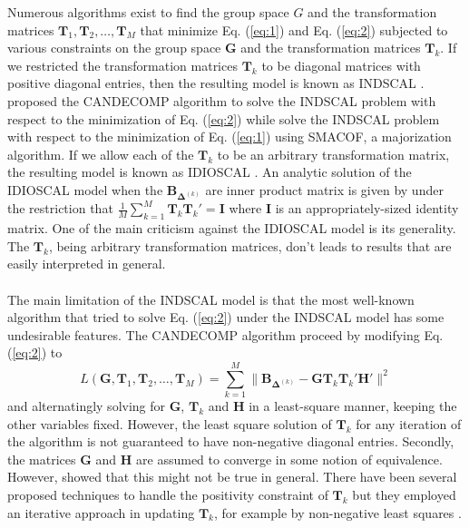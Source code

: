 \documentclass[11pt]{asaproc}
\begin{document}
  \noindent Numerous algorithms exist to find the group space $G$ and the
  transformation matrices $\mathbf{T}_1, \mathbf{T}_{2}, \dots,
  \mathbf{T}_M$ that minimize Eq. (\ref{eq:1}) and Eq. (\ref{eq:2})
  subjected to various constraints on the group space $\mathbf{G}$ and
  the transformation matrices $\mathbf{T}_k$. If we restricted the
  transformation matrices $\mathbf{T}_k$ to be diagonal matrices with
  positive diagonal entries, then the resulting model is known as
  INDSCAL \citep{carroll70:_analy_n_eckar_young}. \citet{carroll70:_analy_n_eckar_young}
  proposed the CANDECOMP algorithm to solve the INDSCAL problem with
  respect to the minimization of Eq. (\ref{eq:2}) while
  \citet{leeuw80:_multiv,leeuw09:_multid_scalin_using_major} solve the
  INDSCAL problem with respect to the minimization of Eq. (\ref{eq:1})
  using SMACOF, a majorization algorithm. If we allow each of the
  $\mathbf{T}_k$ to be an arbitrary transformation matrix, the
  resulting model is known as IDIOSCAL \citep{carroll74:_contem}. An
  analytic solution of the IDIOSCAL model when the
  $\mathbf{B}_{\bm{\Delta}^{(k)}}$ are inner product matrix is
  given by \citet{schonemann72} under the restriction that
  $\tfrac{1}{M}\sum_{k=1}^{M}{\mathbf{T}_k \mathbf{T}_k'} = \mathbf{I}$ where
  $\mathbf{I}$ is an appropriately-sized identity matrix. One of the
  main criticism against the IDIOSCAL model is its generality. The
  $\mathbf{T}_k$, being arbitrary transformation matrices, don't
  leads to results that are easily interpreted in general. \\ \\

  \noindent The main limitation of the INDSCAL model is that the most well-known
  algorithm that tried to solve Eq. (\ref{eq:2}) under the INDSCAL
  model has some undesirable features. The CANDECOMP algorithm
  \citep{carroll70:_analy_n_eckar_young} proceed by modifying
  Eq. (\ref{eq:2}) to 
  \begin{equation}
    \label{eq:2}
    L(\mathbf{G}, \mathbf{T}_1, \mathbf{T}_2, \dots, \mathbf{T}_M)
    = \sum_{k = 1}^{M}\| \mathbf{B}_{\bm{\Delta}^{(k)}} -
    \mathbf{G}\mathbf{T}_k \mathbf{T}_k' \mathbf{H}' \|^2 
  \end{equation}
  and alternatingly solving for $\mathbf{G}$, $\mathbf{T}_k$ and
  $\mathbf{H}$ in a least-square manner, keeping the other variables
  fixed. However, the least square solution of $\mathbf{T}_k$ for any
  iteration of the algorithm is not guaranteed to have non-negative
  diagonal entries. Secondly, the matrices $\mathbf{G}$
  and $\mathbf{H}$ are assumed to converge in some notion of
  equivalence. However, \citet{berge91:_some_candec_indsc} showed that
  this might not be true in general. There have been several proposed
  techniques to handle the positivity constraint of $\mathbf{T}_k$ but
  they employed an iterative approach in updating $\mathbf{T}_k$,
  for example by non-negative least squares
  \citet{berge93:_comput_indsc}. 
  
\end{document}
